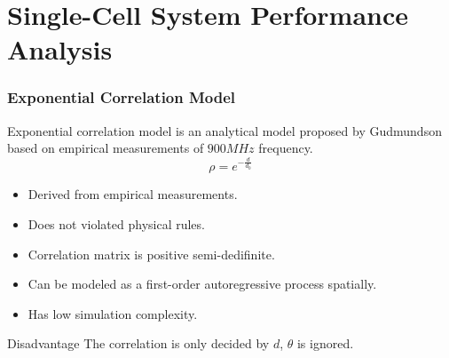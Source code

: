 \documentclass{beamer}
\begin{document}
%
%
\section{Single-Cell System Performance Analysis}

\begin{frame}
\frametitle{Exponential Correlation Model}
Exponential correlation model is an analytical model proposed by Gudmundson based on empirical measurements of $900MHz$ frequency.
\begin{equation}
\rho = e^{-\frac{d}{d_{0}}}
\end{equation}
\begin{itemize}
\item Derived from empirical measurements.
\item Does not violated physical rules.
\item Correlation matrix is positive semi-dedifinite.
\item Can be modeled as a first-order autoregressive process spatially.
\item Has low simulation complexity.
\end{itemize}
\begin{block}{Disadvantage}
The correlation is only decided by $d$, $\theta$ is ignored.
\end{block}
\end{frame}
\end{document}
